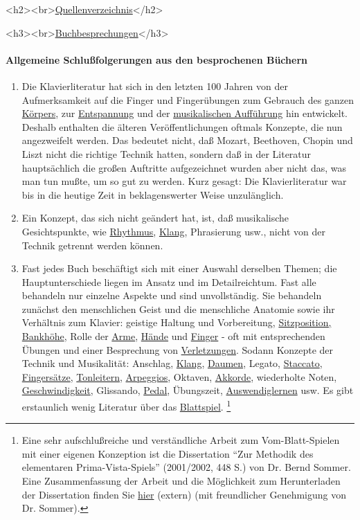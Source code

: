 
\label{reference}

<h2><br>\underline{Quellenverzeichnis}</h2>

<h3><br>\underline{Buchbesprechungen}</h3>

\paragraph{Allgemeine Schlußfolgerungen aus den besprochenen Büchern}
\label{allgemein}

\begin{enumerate}[label={\arabic*.}] 
\item 
Die Klavierliteratur hat sich in den letzten 100 Jahren von der Aufmerksamkeit auf die Finger und Fingerübungen zum Gebrauch des ganzen \hyperref[c1iii4c]{Körpers}, zur \hyperref[c1ii14]{Entspannung} und der \hyperref[c1iii14d]{musikalischen Aufführung} hin entwickelt.
Deshalb enthalten die älteren Veröffentlichungen oftmals Konzepte, die nun angezweifelt werden.
Das bedeutet nicht, daß Mozart, Beethoven, Chopin und Liszt nicht die richtige Technik hatten, sondern daß in der Literatur hauptsächlich die großen Auftritte aufgezeichnet wurden aber nicht das, was man tun mußte, um so gut zu werden.
Kurz gesagt: Die Klavierliteratur war bis in die heutige Zeit in beklagenswerter Weise unzulänglich.

\item Ein Konzept, das sich nicht geändert hat, ist, daß musikalische Gesichtspunkte, wie \hyperref[c1iii1b]{Rhythmus}, \hyperref[c1iii1]{Klang}, Phrasierung usw., nicht von der Technik getrennt werden können.

\item Fast jedes Buch beschäftigt sich mit einer Auswahl derselben Themen; die Hauptunterschiede liegen im Ansatz und im Detailreichtum.
Fast alle behandeln nur einzelne Aspekte und sind unvollständig.
Sie behandeln zunächst den menschlichen Geist und die menschliche Anatomie sowie ihr Verhältnis zum Klavier: geistige Haltung und Vorbereitung, \hyperref[c1ii3]{Sitzposition, Bankhöhe}, Rolle der \hyperref[c1ii10]{Arme}, \hyperref[c1iii4]{Hände} und \hyperref[c1iii4b]{Finger} - oft mit entsprechenden Übungen und einer Besprechung von \hyperref[c1iii10hand]{Verletzungen}.
Sodann Konzepte der Technik und Musikalität: Anschlag, \hyperref[c1iii1]{Klang}, \hyperref[c1iii5a]{Daumen}, Legato, \hyperref[c1iii1c]{Staccato}, \hyperref[c1ii18]{Fingersätze}, \hyperref[c1iii5a]{Tonleitern}, \hyperref[Arpeggios]{Arpeggios}, Oktaven, \hyperref[c1iii7e]{Akkorde}, wiederholte Noten, \hyperref[c1ii13]{Geschwindigkeit}, Glissando, \hyperref[c1ii23]{Pedal}, Übungszeit, \hyperref[c1iii6]{Auswendiglernen} usw.
Es gibt erstaunlich wenig Literatur über das \hyperref[c1iii11]{Blattspiel}.
\label{c030530}\footnote{Eine sehr aufschlußreiche und verständliche Arbeit zum Vom-Blatt-Spielen mit einer eigenen Konzeption ist die Dissertation \enquote{Zur Methodik des elementaren Prima-Vista-Spiels} (2001/2002, 448 S.) von Dr. Bernd Sommer.
Eine Zusammenfassung der Arbeit und die Möglichkeit zum Herunterladen der Dissertation finden Sie \hyperref[http://www.dissertation.de/buch.php3?buch=1405]{hier} (extern) (mit freundlicher Genehmigung von Dr. Sommer).}


\end{enumerate}
